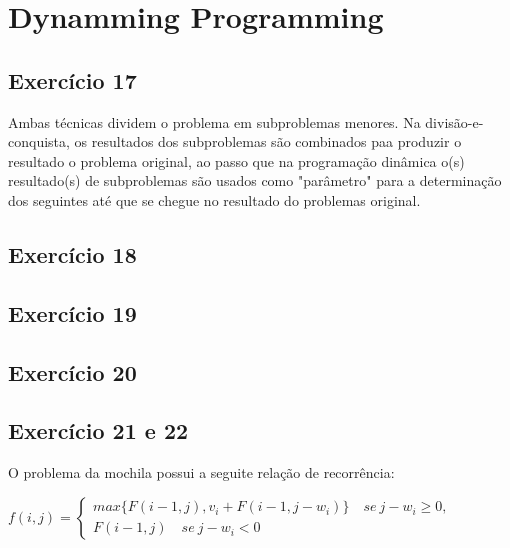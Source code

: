 
\newpage

\section{Dynamming Programming}\label{sec:dynamic_programming}

\subsection{Exercício 17}\label{sec:exer17}
Ambas técnicas dividem o problema em subproblemas menores. Na divisão-e-conquista,
os resultados dos subproblemas são combinados paa produzir o resultado o problema
original, ao passo que na programação dinâmica o(s) resultado(s) de subproblemas
são usados como "parâmetro" para a determinação dos seguintes até que se chegue
no resultado do problemas original.

\subsection{Exercício 18}\label{sec:exer18}



\newpage
\subsection{Exercício 19}\label{sec:exer19}



\newpage
\subsection{Exercício 20}\label{sec:exer20}



\subsection{Exercício 21 e 22}\label{sec:exer21}
O problema da mochila possui a seguite relação de recorrência:

$
f(i, j) =
\begin{cases} 
max \{F(i-1, j), v_i+F(i-1, j-w_i)\} \quad se\ j-w_i \ge 0,\\
F(i-1, j) \quad se\ j-w_i < 0
\end{cases}
$

